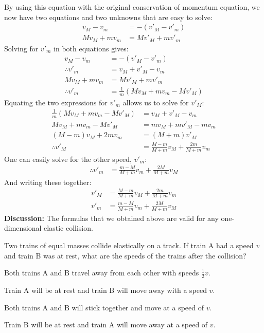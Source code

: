\begin{example}
By using this equation with the original conservation of momentum equation, we now have two equations and two unknowns that are easy to solve:
\begin{align*}
v_M-v_m &= - (v'_M-v'_m)\\
Mv_M+mv_m&=Mv'_M+mv'_m
\end{align*}
Solving for $v'_m$ in both equations gives:
\begin{align*}
v_M-v_m &= - (v'_M-v'_m)\\
\therefore v'_m &= v_M+v'_M-v_m\\
Mv_M+mv_m&=Mv'_M+mv'_m\\
\therefore v'_m&=\frac{1}{m}(Mv_M+mv_m-Mv'_M)
\end{align*}
Equating the two expressions for $v'_m$ allows us to solve for $v'_M$:
\begin{align*}
\frac{1}{m}(Mv_M+mv_m-Mv'_M)&=v_M+v'_M-v_m\\
Mv_M+mv_m-Mv'_M&=mv_M+mv'_M-mv_m\\
(M-m)v_M+2mv_m&=(M+m)v'_M\\
\therefore v'_M&=\frac{M-m}{M+m}v_M+\frac{2m}{M+m}v_m
\end{align*}
One can easily solve for the other speed, $v'_m$:
\begin{align*}
\therefore v'_m &= \frac{m-M}{M+m}v_m+\frac{2M}{M+m}v_M
\end{align*}
And writing these together:
\begin{align*}
v'_M&=\frac{M-m}{M+m}v_M+\frac{2m}{M+m}v_m\\
v'_m &= \frac{m-M}{M+m}v_m+\frac{2M}{M+m}v_M
\end{align*}
\textbf{Discussion:} The formulas that we obtained above are valid for any one-dimensional elastic collision. 
\end{example}

\begin{checkpoint}
\begin{MCquestion}{Two trains of equal masses collide elastically on a track. If train A had a speed $v$ and train B was at rest, what are the speeds of the trains after the collision?}
\item Both trains A and B travel away from each other with speeds $\frac{1}{2}v$.
\item Train A will be at rest and train B will move away with a speed $v$.\correct
\item Both trains A and B will stick together and move at a speed of $v$.
\item Train B will be at rest and train A will move away at a speed of $v$.
\end{MCquestion}
\end{checkpoint}

